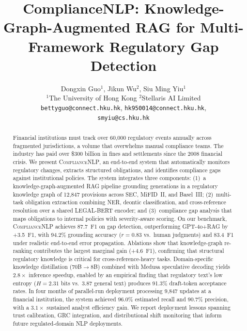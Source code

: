\documentclass[11pt]{article}
\title{ComplianceNLP: Knowledge-Graph-Augmented RAG for
	Multi-Framework Regulatory Gap Detection}
\author{
	Dongxin Guo$^{1}$, Jikun Wu$^{2}$, Siu Ming Yiu$^{1}$ \\
	$^{1}$The University of Hong Kong \quad $^{2}$Stellaris AI Limited \\
	\texttt{bettyguo@connect.hku.hk}, \texttt{hk950014@connect.hku.hk}, \\
	\texttt{smyiu@cs.hku.hk}
}
\begin{document}
\maketitle

\begin{abstract}
	Financial institutions must track over 60{,}000 regulatory events annually 
	across fragmented jurisdictions, a volume that overwhelms manual compliance 
	teams. The industry has paid over \$300 billion in fines and settlements 
	since the 2008 financial crisis. We present \textsc{ComplianceNLP}, an end-to-end system that automatically monitors regulatory changes, extracts structured obligations, and identifies compliance gaps against institutional policies. The system integrates three components: (1)~a knowledge-graph-augmented RAG pipeline grounding generations in a regulatory knowledge graph of 12{,}847 provisions across SEC, MiFID~II, and Basel~III; (2)~multi-task obligation extraction combining NER, deontic classification, and cross-reference resolution over a shared LEGAL-BERT encoder; and (3)~compliance gap analysis that maps obligations to internal policies with severity-aware scoring. On our benchmark, \textsc{ComplianceNLP} achieves 87.7~F1 on gap detection, outperforming GPT-4o+RAG by +3.5~F1, with 94.2\% grounding accuracy ($r{=}0.83$ vs.\ human judgments) and 83.4~F1 under realistic end-to-end error propagation. Ablations show that knowledge-graph re-ranking contributes the largest marginal gain (+4.6~F1), confirming that structural regulatory knowledge is critical for cross-reference-heavy tasks. Domain-specific knowledge distillation (70B$\to$8B) combined with Medusa speculative decoding yields $2.8\times$ inference speedup, enabled by an empirical finding that regulatory text's low entropy ($H{=}2.31$ bits vs.\ $3.87$ general text) produces 91.3\% draft-token acceptance rates. In four months of parallel-run deployment processing 9{,}847 updates at a financial institution, the system achieved 96.0\% estimated recall and 90.7\% precision, with a $3.1\times$ sustained analyst efficiency gain. We report deployment lessons spanning trust calibration, GRC integration, and distributional shift monitoring that inform future regulated-domain NLP deployments.
\end{abstract}

\end{document}
